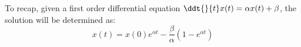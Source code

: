 To recap, given a first order differential equation $\ddt{}{t} x(t) = \alpha x(t) + \beta$, the solution will be determined as:
\begin{equation} \label{eq:nhs}
    x(t) = x(0) e^{\alpha t} - \frac{\beta}{\alpha} (1 - e^{\alpha t})
\end{equation}









